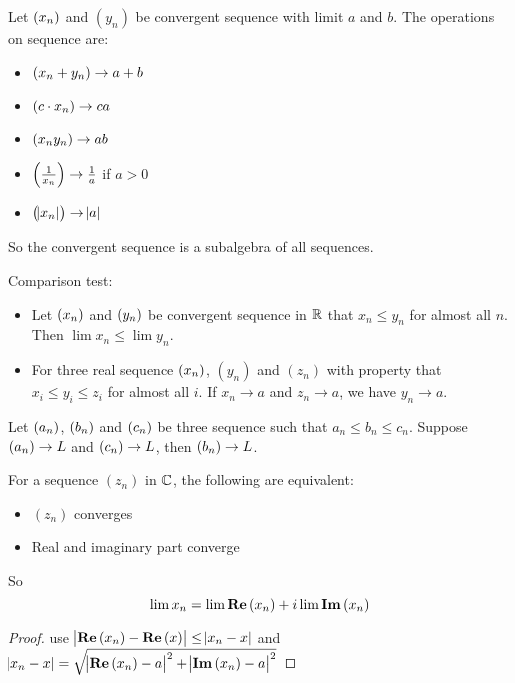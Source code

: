\begin{theorem}
    Let $\sequence{x_n}$ and $(y_n)$ be convergent sequence with limit $a$ and $b$. The operations on sequence are:
    \begin{itemize}
        \item $\sequence{x_n + y_n} \rightarrow a + b$
        \item $\sequence{c \cdot x_n} \rightarrow c a$
        \item $\sequence{x_n y_n} \rightarrow ab$
        \item $\intoo{\frac{1}{x_n}} \rightarrow \frac{1}{a}$ if $a > 0$
        \item $\sequence{\absolutevalue{x_n}} \rightarrow \absolutevalue{a}$
    \end{itemize}
    
    So the convergent sequence is a subalgebra of all sequences.
\end{theorem}

\begin{theorem}
    Comparison test:
    \begin{itemize}
        \item Let $\sequence{x_n}$ and $\sequence{y_n}$ be convergent sequence in $\mathbb{R}$ that $x_n \leq y_n$ for almost all $n$. Then $\lim x_n \leq \lim y_n$.
        \item For three real sequence $\sequence{x_n}$, $(y_n)$ and $(z_n)$ with property that $x_i \leq y_i \leq z_i$ for almost all $i$. If $x_n \rightarrow a$ and $z_n \rightarrow a$, we have $y_n \rightarrow a$.
    \end{itemize}
\end{theorem}

\begin{theorem}
    Let $\sequence{a_n}$, $\sequence{b_n}$ and $\sequence{c_n}$ be three sequence such that $a_n \leq b_n \leq c_n$. Suppose $\sequence{a_n} \rightarrow L$ and $\sequence{c_n} \rightarrow L$, then $\sequence{b_n} \rightarrow L$.
\end{theorem}


\begin{theorem}
    For a sequence $(z_n)$ in $\mathbb{C}$, the following are equivalent:
    \begin{itemize}
        \item $(z_n)$ converges
        \item Real and imaginary part converge
    \end{itemize}
    
    So 
    \begin{equation}
        \lim x_n = \lim \mathop{\bf Re\/}\text{(}x_n\text{)} + i \lim \mathop{\bf Im\/}\text{(}x_n\text{)}
    \end{equation}
\end{theorem}
\begin{proof}
    use $\abs{\mathop{\bf Re\/}\text{(}x_n\text{)} - \mathop{\bf Re\/}\text{(}x\text{)}} \leq \abs{x_n - x}$ and $\abs{x_n -x} = \sqrt{\abs{\mathop{\bf Re\/}\text{(}x_n\text{)} - a}^2 + \abs{\mathop{\bf Im\/}\text{(}x_n\text{)} - a}^2}$
\end{proof}


